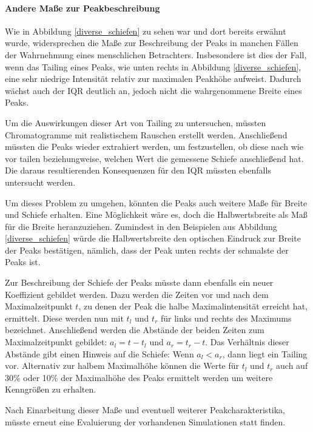 \paragraph{Andere Maße zur Peakbeschreibung}
Wie in Abbildung \ref{diverse_schiefen} zu sehen war und dort bereits erwähnt wurde, widersprechen die Maße zur Beschreibung der Peaks in manchen Fällen der Wahrnehmung eines menschlichen Betrachters. Insbesondere ist dies der Fall, wenn das Tailing eines Peaks, wie unten rechts in Abbildung \ref{diverse_schiefen}, eine sehr niedrige Intensität relativ zur maximalen Peakhöhe aufweist. Dadurch wächst auch der IQR deutlich an, jedoch nicht die wahrgenommene Breite eines Peaks.

Um die Auswirkungen dieser Art von Tailing zu untersuchen, müssten Chromatogramme mit realistischem Rauschen erstellt werden. Anschließend müssten die Peaks wieder extrahiert werden, um festzustellen, ob diese nach wie vor tailen beziehungweise, welchen Wert die gemessene Schiefe anschließend hat. Die daraus resultierenden Konsequenzen für den IQR müssten ebenfalls untersucht werden.

Um dieses Problem zu umgehen, könnten die Peaks auch weitere Maße für Breite und Schiefe erhalten. Eine Möglichkeit wäre es, doch die Halbwertsbreite als Maß für die Breite heranzuziehen. Zumindest in den Beispielen aus Abbildung \ref{diverse_schiefen} würde die Halbwertsbreite den optischen Eindruck zur Breite der Peaks bestätigen, nämlich, dass der Peak unten rechts der schmalste der Peaks ist. 

Zur Beschreibung der Schiefe der Peaks müsste dann ebenfalls ein neuer Koeffizient gebildet werden. Dazu werden die Zeiten vor und nach dem Maximalzeitpunkt $t$, zu denen der Peak die halbe Maximalintensität erreicht hat, ermittelt. Diese werden nun mit $t_l$ und $t_r$ für links und rechts des Maximums bezeichnet. Anschließend werden die Abstände der beiden Zeiten zum Maximalzeitpunkt gebildet: $a_l = t-t_l$ und $a_r = t_r -t$. Das Verhältnis dieser Abstände gibt einen Hinweis auf die Schiefe: Wenn $a_l < a_r$, dann liegt ein Tailing vor.
Alternativ zur halbem Maximalhöhe können die Werte für $t_l$ und $t_r$ auch auf 30\% oder 10\% der Maximalhöhe des Peaks ermittelt werden um weitere Kenngrößen zu erhalten.

Nach Einarbeitung dieser Maße und eventuell weiterer Peakcharakteristika, müsste erneut eine Evaluierung der vorhandenen Simulationen statt finden. 


